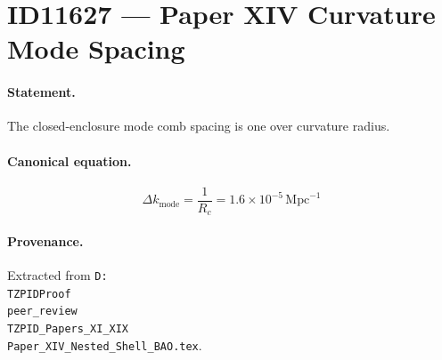 \section*{ID11627 --- Paper XIV Curvature Mode Spacing}

\paragraph{Statement.}
The closed-enclosure mode comb spacing is one over curvature radius.

\paragraph{Canonical equation.}
\[
\Delta k_{\mathrm{mode}}=\frac{1}{R_c}=1.6\times10^{-5}\,\mathrm{Mpc}^{-1}
\]

\paragraph{Provenance.}
Extracted from \texttt{D:\\TZPIDProof\\peer\_review\\TZPID\_Papers\_XI\_XIX\\Paper\_XIV\_Nested\_Shell\_BAO.tex}.
